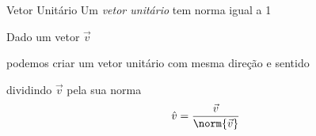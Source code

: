 \documentclass[fleqn,aspectratio=169,12pt]{beamer}
\begin{document}
\begin{frame}{Vetor Unitário}
  Um \emph{vetor unitário} tem norma igual a 1

  \pause
  Dado um vetor $\vec{v}$

  \pause
  podemos criar um vetor unitário com mesma direção e sentido

  \pause
  dividindo $\vec{v}$ pela sua norma
  \[
    \hat{v} = \frac{\vec{v}}{\norm{\vec{v}}}
  \]
\end{frame}





%
%

\end{document}
